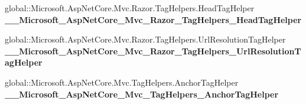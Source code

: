 \begin{DoxyCompactItemize}
\item 
\mbox{\label{class_asp_net_core_1_1_views___shared_____layout_a3f0be4c8a0e2195759b1b234cbc17bfe}} 
global\+::\+Microsoft.\+Asp\+Net\+Core.\+Mvc.\+Razor.\+Tag\+Helpers.\+Head\+Tag\+Helper {\bfseries \+\_\+\+\_\+\+Microsoft\+\_\+\+Asp\+Net\+Core\+\_\+\+Mvc\+\_\+\+Razor\+\_\+\+Tag\+Helpers\+\_\+\+Head\+Tag\+Helper}
\item 
\mbox{\label{class_asp_net_core_1_1_views___shared_____layout_acb30abacd2e19dfb94e37dbae322feee}} 
global\+::\+Microsoft.\+Asp\+Net\+Core.\+Mvc.\+Razor.\+Tag\+Helpers.\+Url\+Resolution\+Tag\+Helper {\bfseries \+\_\+\+\_\+\+Microsoft\+\_\+\+Asp\+Net\+Core\+\_\+\+Mvc\+\_\+\+Razor\+\_\+\+Tag\+Helpers\+\_\+\+Url\+Resolution\+Tag\+Helper}
\item 
\mbox{\label{class_asp_net_core_1_1_views___shared_____layout_a1b2865c11b52e61b995892a5b029fc97}} 
global\+::\+Microsoft.\+Asp\+Net\+Core.\+Mvc.\+Tag\+Helpers.\+Anchor\+Tag\+Helper {\bfseries \+\_\+\+\_\+\+Microsoft\+\_\+\+Asp\+Net\+Core\+\_\+\+Mvc\+\_\+\+Tag\+Helpers\+\_\+\+Anchor\+Tag\+Helper}
\end{DoxyCompactItemize}
